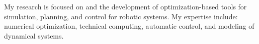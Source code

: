 

\begin{cvparagraph}

My research is focused on  and the development of optimization-based tools for simulation, planning, and control for robotic systems. My expertise include: numerical optimization, technical computing, automatic control, and modeling of dynamical systems.
\end{cvparagraph}
